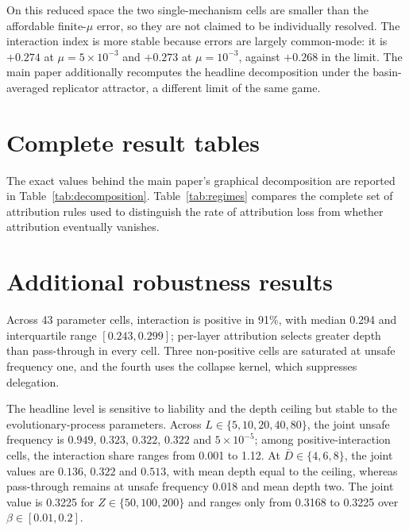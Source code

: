 \documentclass[a4paper,fleqn]{cas-sc}
\begin{document}
On this reduced space the two single-mechanism cells are smaller than the
affordable finite-$\mu$ error, so they are not claimed to be individually
resolved. The interaction index is more stable because errors are largely
common-mode: it is $+0.274$ at $\mu=5\times10^{-3}$ and $+0.273$ at
$\mu=10^{-3}$, against $+0.268$ in the limit. The main paper additionally
recomputes the headline decomposition under the basin-averaged replicator
attractor, a different limit of the same game.

\section{Complete result tables}
\label{supp:result-tables}

The exact values behind the main paper's graphical decomposition are reported
in Table~\ref{tab:decomposition}. Table~\ref{tab:regimes} compares the complete
set of attribution rules used to distinguish the rate of attribution loss from
whether attribution eventually vanishes.




\section{Additional robustness results}
\label{supp:robustness}

Across 43 parameter cells, interaction is positive in 91\%, with median 0.294
and interquartile range $[0.243,0.299]$; per-layer attribution selects greater
depth than pass-through in every cell. Three non-positive cells are saturated
at unsafe frequency one, and the fourth uses the collapse kernel, which
suppresses delegation.

The headline level is sensitive to liability and the depth ceiling but stable
to the evolutionary-process parameters. Across
$L\in\{5,10,20,40,80\}$, the joint unsafe frequency is $0.949$, $0.323$,
$0.322$, $0.322$ and $5\times10^{-5}$; among positive-interaction cells, the
interaction share ranges from 0.001 to 1.12. At
$\bar D\in\{4,6,8\}$, the joint values are $0.136$, $0.322$ and $0.513$, with
mean depth equal to the ceiling, whereas pass-through remains at unsafe
frequency 0.018 and mean depth two. The joint value is 0.3225 for
$Z\in\{50,100,200\}$ and ranges only from 0.3168 to 0.3225 over
$\beta\in[0.01,0.2]$.
\end{document}
